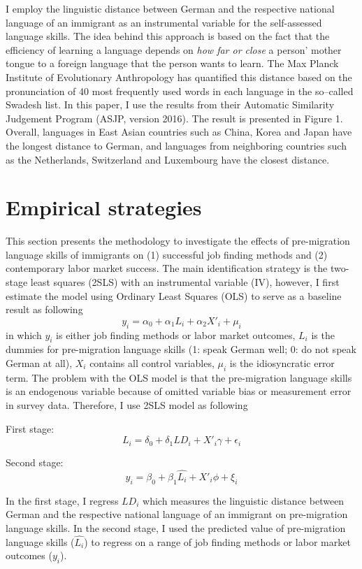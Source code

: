 \documentclass[12pt,a4paper]{article}
\begin{document}
I employ the linguistic distance between German and the respective national language of an immigrant as an instrumental variable for the self-assessed language skills. The idea behind this approach is based on the fact that the efficiency of learning a language depends on \textit{how far or close} a person' mother tongue to a foreign language that the person wants to learn. The Max Planck Institute of Evolutionary Anthropology has quantified this distance based on the pronunciation of 40 most frequently used words in each language in the so--called Swadesh list. In this paper, I use the results from their Automatic Similarity Judgement Program (ASJP, version 2016). The result is presented in Figure 1. Overall, languages in East Asian countries such as China, Korea and Japan have the longest distance to German, and languages from neighboring countries such as the Netherlands, Switzerland and Luxembourg have the closest distance.

\section{Empirical strategies}

This section presents the methodology to investigate the effects of pre-migration language skills of immigrants on (1) successful job finding methods and (2) contemporary labor market success. The main identification strategy is the two-stage least squares (2SLS) with an instrumental variable (IV), however, I first estimate the model using Ordinary Least Squares (OLS) to serve as a baseline result as following
$$y_{i}=\alpha_{0}+\alpha_{1}L_{i}+\alpha_{2}X'_{i}+\mu_{i}$$
in which $y_{i}$ is either job finding methods or labor market outcomes, $L_{i}$ is the dummies for pre-migration language skills (1: speak German well; 0: do not speak German at all), $X_{i}$ contains all control variables, $\mu_{i}$ is the idiosyncratic error term. The problem with the OLS model is that the pre-migration language skills is an endogenous variable because of omitted variable bias or measurement error in survey data. Therefore, I use 2SLS model as following

First stage:
$$L_{i}=\delta_{0}+\delta_{1}LD_{i}+X'_{i}\gamma+\epsilon_{i}$$

Second stage:
$$y_{i}=\beta_{0}+\beta_{1}\hat{L_{i}}+X'_{i}\phi+\xi_{i}$$

In the first stage, I regress $LD_{i}$ which measures the linguistic distance between German and the respective national language of an immigrant on pre-migration language skills. In the second stage, I used the predicted value of pre-migration language skills ($\hat{L_{i}}$) to regress on a range of job finding methods or labor market outcomes ($y_{i}$).
\end{document}
